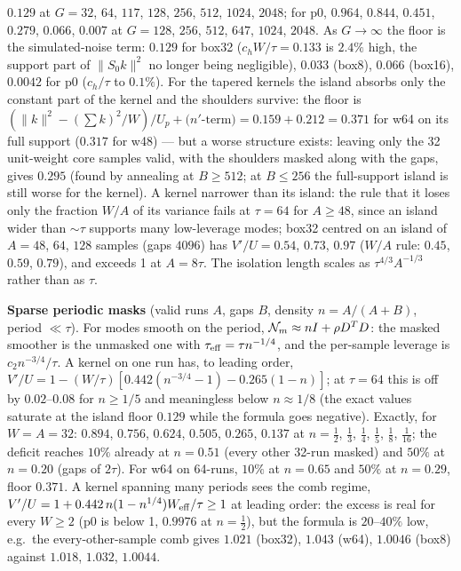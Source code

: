 \documentclass{article}
\numberwithin{equation}{section}   %
\begin{document}
$0.129$ at $G = 32$, $64$, $117$, $128$, $256$, $512$, $1024$, $2048$; for p0, $0.964$, $0.844$, $0.451$,
$0.279$, $0.066$, $0.007$ at $G = 128$, $256$, $512$, $647$, $1024$, $2048$.  As $G \rightarrow \infty$
the floor is the simulated-noise term: $0.129$ for box32 ($c_h W/\tau = 0.133$ is $2.4\%$ high, the
support part of $\|S_0k\|^2$ no longer being negligible), $0.033$ (box8), $0.066$ (box16), $0.0042$ for
p0 ($c_h/\tau$ to $0.1\%$).  For the tapered kernels the island absorbs only the constant part of the
kernel and the shoulders survive: the floor is $(\|k\|^2 - (\sum k)^2/W)/U_p + \mbox{($n'$-term)} =
0.159 + 0.212 = 0.371$ for w64 on its full support ($0.317$ for w48) --- but a worse structure exists:
leaving only the 32 unit-weight core samples valid, with the shoulders masked along with the gaps, gives
$0.295$ (found by annealing at $B \ge 512$; at $B \le 256$ the full-support island is still worse for the
kernel).  A kernel narrower than its island: the rule that it loses only the fraction $W/A$ of its
variance fails at $\tau = 64$ for $A \ge 48$, since an island wider than $\sim\tau$ supports many
low-leverage modes; box32 centred on an island of $A = 48$, $64$, $128$ samples (gaps $4096$) has
$V'/U = 0.54$, $0.73$, $0.97$ ($W/A$ rule: $0.45$, $0.59$, $0.79$), and exceeds 1 at $A = 8\tau$.  The
isolation length scales as $\tau^{4/3}A^{-1/3}$ rather than as $\tau$.

{\bf Sparse periodic masks} (valid runs $A$, gaps $B$, density $n = A/(A+B)$, period $\ll \tau$).
For modes smooth on the period, ${\cal N}_m \approx nI + \rho D^TD$: the masked smoother is the unmasked
one with $\tau_{\rm eff} = \tau n^{-1/4}$, and the per-sample leverage is $c_2 n^{-3/4}/\tau$.  A kernel on
one run has, to leading order, $V'/U = 1 - (W/\tau)[0.442(n^{-3/4} - 1) - 0.265(1 - n)]$; at $\tau = 64$
this is off by $0.02$--$0.08$ for $n \ge 1/5$ and meaningless below $n \approx 1/8$ (the exact values
saturate at the island floor $0.129$ while the formula goes negative).  Exactly, for $W = A = 32$:
$0.894$, $0.756$, $0.624$, $0.505$, $0.265$, $0.137$ at $n = \tfrac12$, $\tfrac13$, $\tfrac14$,
$\tfrac15$, $\tfrac18$, $\tfrac1{16}$; the deficit reaches $10\%$ already at $n = 0.51$ (every other
32-run masked) and $50\%$ at $n = 0.20$ (gaps of $2\tau$).  For w64 on 64-runs, $10\%$ at $n = 0.65$ and
$50\%$ at $n = 0.29$, floor $0.371$.  A kernel spanning many periods sees the comb regime,
$V'/U = 1 + 0.442\,n(1 - n^{1/4})W_{\rm eff}/\tau \ge 1$ at leading order: the excess is real for every
$W \ge 2$ (p0 is below 1, $0.9976$ at $n = \tfrac12$), but the formula is $20$--$40\%$ low, e.g.\ the
every-other-sample comb gives $1.021$ (box32), $1.043$ (w64), $1.0046$ (box8) against $1.018$, $1.032$,
$1.0044$.
\end{document}
